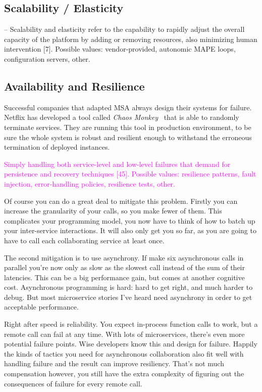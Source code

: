 \documentclass[thesis=M,english,hidelinks]{FITthesis}[2012/10/20]
\begin{document}
\subsection{Scalability / Elasticity}
\label{sec:scalability}
– Scalability and elasticity refer to the capability to rapidly adjust the overall capacity of the platform by adding or removing resources, also minimizing human intervention [7]. Possible values: vendor-provided, autonomic MAPE loops, configuration servers, other.



\subsection{Availability and Resilience}
\label{sec:resilience}
Successful companies that adapted \acrshort{MSA} always design their systems for failure. 
Netflix has developed a tool called \textit{Chaos Monkey}~\cite{chaos-monkey} that is able to randomly terminate services. They are running this tool in production environment, to be sure the whole system is robust and resilient enough to withstand the erroneous termination of deployed instances.



\textcolor{magenta}{Simply handling both service-level and low-level failures that demand for persistence and recovery techniques [45]. Possible values: resilience patterns, fault injection, error-handling policies, resilience tests, other.}



Of course you can do a great deal to mitigate this problem. Firstly you can increase the granularity of your calls, so you make fewer of them. This complicates your programming model, you now have to think of how to batch up your inter-service interactions. It will also only get you so far, as you are going to have to call each collaborating service at least once.

The second mitigation is to use asynchrony. If make six asynchronous calls in parallel you're now only as slow as the slowest call instead of the sum of their latencies. This can be a big performance gain, but comes at another cognitive cost. Asynchronous programming is hard: hard to get right, and much harder to debug. But most microservice stories I've heard need asynchrony in order to get acceptable performance.

Right after speed is reliability. You expect in-process function calls to work, but a remote call can fail at any time. With lots of microservices, there's even more potential failure points. Wise developers know this and design for failure. Happily the kinds of tactics you need for asynchronous collaboration also fit well with handling failure and the result can improve resiliency. That's not much compensation however, you still have the extra complexity of figuring out the consequences of failure for every remote call.
\end{document}
